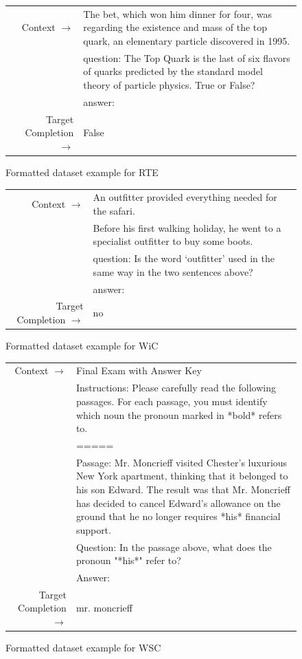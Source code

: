 \documentclass{article}
\begin{document}
\begin{figure} { \tt \footnotesize \begin{tabularx}{\linewidth}{r X} \toprule Context $\to$ & The bet, which won him dinner for four, was regarding the existence and mass of the top quark, an elementary particle discovered in 1995. \\ 
 & question: The Top Quark is the last of six flavors of quarks predicted by the standard model theory of particle physics. True or False? \\ 
 & answer: \\ 
 \midrule Target Completion $\to$ & False\\ \bottomrule \end{tabularx} }  \caption{Formatted dataset example for RTE}  \label{eval:RTE}  \end{figure}
\begin{figure} { \tt \footnotesize \begin{tabularx}{\linewidth}{r X} \toprule Context $\to$ & An outfitter provided everything needed for the safari. \\ 
 & Before his first walking holiday, he went to a specialist outfitter to buy some boots. \\ 
 & question: Is the word `outfitter' used in the same way in the two sentences above? \\ 
 & answer: \\ 
 \midrule Target Completion $\to$ & no\\ \bottomrule \end{tabularx} }  \caption{Formatted dataset example for WiC}  \label{eval:WiC}  \end{figure}
\begin{figure} { \tt \footnotesize \begin{tabularx}{\linewidth}{r X} \toprule Context $\to$ & Final Exam with Answer Key \\ 
 & Instructions: Please carefully read the following passages. For each passage, you must identify which noun the pronoun marked in *bold* refers to. \\ 
 & ===== \\ 
 & Passage: Mr. Moncrieff visited Chester's luxurious New York apartment, thinking that it belonged to his son Edward. The result was that Mr. Moncrieff has decided to cancel Edward's allowance on the ground that he no longer requires *his* financial support. \\ 
 & Question: In the passage above, what does the pronoun "*his*" refer to? \\ 
 & Answer: \\ 
 \midrule Target Completion $\to$ & mr. moncrieff\\ \bottomrule \end{tabularx} }  \caption{Formatted dataset example for WSC}  \label{eval:WSC}  \end{figure}
\end{document}
